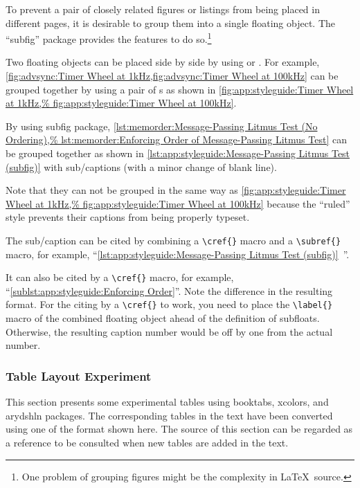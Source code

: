 To prevent a pair of closely related figures or listings
from being placed in different pages, it is desirable to group
them into a single floating object.
The ``subfig'' package provides the features to do so.\footnote{
  One problem of grouping figures might be the complexity in
  \LaTeX\ source.}

Two floating objects can be placed side by side by using
\co{\\parbox} or .
For example,
\cref{fig:advsync:Timer Wheel at 1kHz,fig:advsync:Timer Wheel at 100kHz}
can be grouped together by using a pair of s
as shown in
\cref{fig:app:styleguide:Timer Wheel at 1kHz,%
fig:app:styleguide:Timer Wheel at 100kHz}.

By using subfig package,
\cref{lst:memorder:Message-Passing Litmus Test (No Ordering),%
lst:memorder:Enforcing Order of Message-Passing Litmus Test}
can be grouped together as shown in
\cref{lst:app:styleguide:Message-Passing Litmus Test (subfig)}
with sub\-/captions (with a minor change of blank line).

Note that they can not be grouped in the same way as
\cref{fig:app:styleguide:Timer Wheel at 1kHz,%
fig:app:styleguide:Timer Wheel at 100kHz}
because the ``ruled'' style prevents their captions
from being properly typeset.

The sub\-/caption can be cited by combining a \verb|\cref{}| macro
and a \verb|\subref{}| macro, for example,
``\cref{lst:app:styleguide:Message-Passing Litmus Test (subfig)}\,%
''.

It can also be cited by a \verb|\cref{}| macro, for example,
``\cref{sublst:app:styleguide:Enforcing Order}''.
Note the difference in the resulting format.
For the citing by a \verb|\cref{}| to work, you need to place
the \verb|\label{}| macro of the combined floating object
ahead of the definition of subfloats.
Otherwise, the resulting caption number would be off by one
from the actual number.

\subsubsection{Table Layout Experiment}
\label{sec:app:styleguide:Table Layout Experiment}

This section presents some experimental tables
using booktabs, xcolors, and arydshln packages.
The corresponding tables in the text have been converted using one of
the format shown here.
The source of this section can be regarded as a reference to be
consulted when new tables are added in the text.

